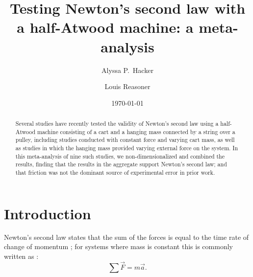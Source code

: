 \documentclass[reprint,amsmath,amssymb,aps,twoside]{revtex4-2}
\begin{document}
\setcounter{page}{91}
\title{Testing Newton's second law with a half-Atwood machine: a meta-analysis}

\author{Alyssa P.~Hacker}
\author{Louis Reasoner}
\date{\today}

\begin{abstract}
Several studies have recently tested the validity of Newton's second law using a half-Atwood machine consisting of a cart and a hanging mass connected by a string over a pulley, including studies conducted with constant force and varying cart mass, as well as studies in which the hanging mass provided varying external force on the system. In this meta-analysis of nine such studies, we non-dimensionalized and combined the results, finding that the results in the aggregate support Newton's second law; and that friction was not the dominant source of experimental error in prior work. 
\end{abstract}


\maketitle\thispagestyle{mytitlepage}





\section{Introduction}
Newton's second law states that the sum of the forces is equal to the time rate of change of momentum \cite{newton1687principia}; for systems where mass is constant this is commonly written as \cite{tipler, barrons}:
\begin{equation}
\sum\vec{F} = m\vec{a}.
\label{eq:n2l}
\end{equation}
\end{document}
